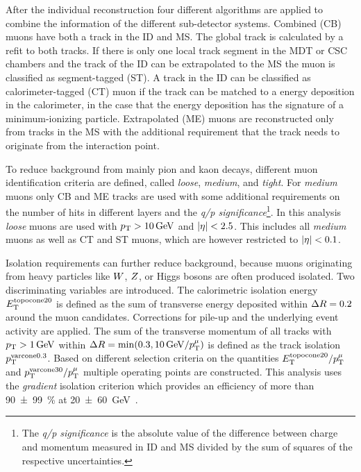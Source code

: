 After the individual reconstruction four different algorithms are applied to combine the information of the different
sub-detector systems.
Combined (CB) muons have both a track in the ID and MS\@. The global track is calculated by a refit to both tracks.
If there is only one local track segment in the MDT or CSC chambers and the track of the ID can be extrapolated to the MS
the muon is classified as segment-tagged (ST).
A track in the ID can be classified as calorimeter-tagged (CT) muon if the track can be matched to a energy deposition
in the calorimeter, in the case that the energy deposition has the signature of a minimum-ionizing particle.
Extrapolated (ME) muons are reconstructed only from tracks in the MS with the additional requirement that the track
needs to originate from the interaction point.

To reduce background from mainly pion and kaon decays, different muon identification criteria are defined, called
\emph{loose}, \emph{medium}, and \emph{tight}.
For \emph{medium} muons only CB and ME tracks are used with some additional requirements on the number of hits in
different layers and the \emph{q/p significance}\footnote{The \emph{q/p significance} is the absolute value of the
difference between charge and momentum measured in ID and MS divided by the sum of squares of the respective uncertainties.}.
In this analysis \emph{loose} muons are used with $\pt > \SI{10}{\GeV}$ and $\left|\eta\right| < 2.5$.
This includes all \emph{medium} muons as well as CT and ST muons, which are however restricted to $\left|\eta\right| < 0.1$.

Isolation requirements can further reduce background, because muons originating from heavy particles like $W$, $Z$,
or Higgs bosons are often produced isolated. Two discriminating variables are introduced.
The calorimetric isolation energy $E_\text{T}^{\text{topocone}20}$ is defined as the sum of transverse energy deposited within
$\Delta R = 0.2$ around the muon candidates.
Corrections for pile-up and the underlying event activity are applied.
The sum of the transverse momentum of all tracks with $\pt > \SI{1}{\GeV}$ within $\dr = \min(0.3, \SI{10}{\GeV} / \pt^\mu)$
is defined as the track isolation $p_\text{T}^{\text{varcone}0.3}$.
Based on different selection criteria on the quantities $E_\text{T}^{\text{topocone}20} / p_\text{T}^\mu$ and
$p_\text{T}^{\text{varcone}30} / p_\text{T}^\mu$ multiple operating points are constructed.
This analysis uses the \emph{gradient} isolation criterion which provides an efficiency of more than
\SI{90(99)}{\percent} at \SI{20(60)}{\GeV}~\cite{PERF-2015-10}.

